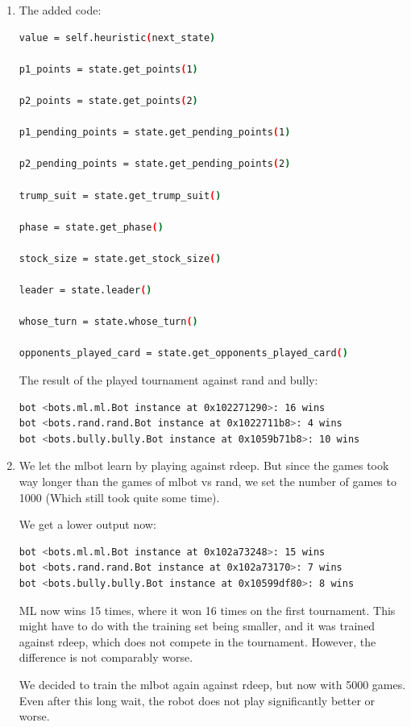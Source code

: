 \documentclass[a4paper,11pt]{article}
\begin{document}
\begin{enumerate}
\item The added code:
\begin{lstlisting}[language=bash]
value = self.heuristic(next_state)

p1_points = state.get_points(1)

p2_points = state.get_points(2)

p1_pending_points = state.get_pending_points(1)

p2_pending_points = state.get_pending_points(2)

trump_suit = state.get_trump_suit()

phase = state.get_phase()

stock_size = state.get_stock_size()

leader = state.leader()

whose_turn = state.whose_turn()

opponents_played_card = state.get_opponents_played_card()
\end{lstlisting}
The result of the played tournament against rand and bully:
\begin{lstlisting}[language=bash]
bot <bots.ml.ml.Bot instance at 0x102271290>: 16 wins
bot <bots.rand.rand.Bot instance at 0x1022711b8>: 4 wins
bot <bots.bully.bully.Bot instance at 0x1059b71b8>: 10 wins
\end{lstlisting}

\item We let the mlbot learn by playing against rdeep. But since the games took way longer than the games of mlbot vs rand, we set the number of games to 1000 (Which still took quite some time).

We get a lower output now:
\begin{lstlisting}[language=bash]
bot <bots.ml.ml.Bot instance at 0x102a73248>: 15 wins
bot <bots.rand.rand.Bot instance at 0x102a73170>: 7 wins
bot <bots.bully.bully.Bot instance at 0x10599df80>: 8 wins
\end{lstlisting}

ML now wins 15 times, where it won 16 times on the first tournament. This might have to do with the training set being smaller, and it was trained against rdeep, which does not compete in the tournament. However, the difference is not comparably worse.

We decided to train the mlbot again against rdeep, but now with 5000 games. 
Even after this long wait, the robot does not play significantly better or worse.


\end{enumerate}
\end{document}
